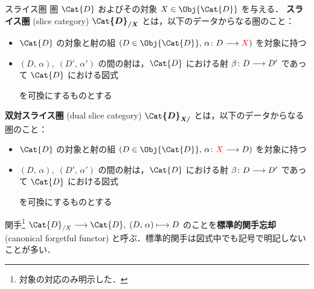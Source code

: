 \documentclass[TQFT_main]{subfiles}
\begin{document}
\begin{mydef}[label=def:slice-category]{スライス圏}
    圏 $\Cat{D}$ およびその対象 $X \in \Obj{\Cat{D}}$ を与える．
    \textbf{スライス圏} (slice category) $\bm{\Cat{D}_{/X}}$ とは，以下のデータからなる圏のこと：
    \begin{itemize}
        \item $\Cat{D}$ の対象と射の組 $(D \in \Obj{\Cat{D}},\, \alpha \colon D \lto \textcolor{red}{X})$ を対象に持つ
        \item $(D,\, \alpha),\; (D',\, \alpha')$ の間の射は，$\Cat{D}$ における射 $\beta \colon D \longrightarrow D'$ であって $\Cat{D}$ における図式
        \begin{center}
        \end{center}
        を可換にするものとする
    \end{itemize}
    
    \tcblower 

    \textbf{双対スライス圏} (dual slice category) $\bm{\Cat{D}_{X/}}$ とは，以下のデータからなる圏のこと：
    \begin{itemize}
        \item $\Cat{D}$ の対象と射の組 $(D \in \Obj{\Cat{D}},\, \alpha \colon \textcolor{red}{X} \lto D)$ を対象に持つ
        \item $(D,\, \alpha),\; (D',\, \alpha')$ の間の射は，$\Cat{D}$ における射 $\beta \colon D \longrightarrow D'$ であって $\Cat{D}$ における図式
        \begin{center}
        \end{center}
        を可換にするものとする
    \end{itemize}
\end{mydef}

関手\footnote{対象の対応のみ明示した．} $\Cat{D}_{/X} \lto \Cat{D},\; (D,\, \alpha) \lmto D$ のことを\textbf{標準的関手忘却} (canonical forgetful functor) と呼ぶ．標準的関手は図式中でも記号で明記しないことが多い．
\end{document}
